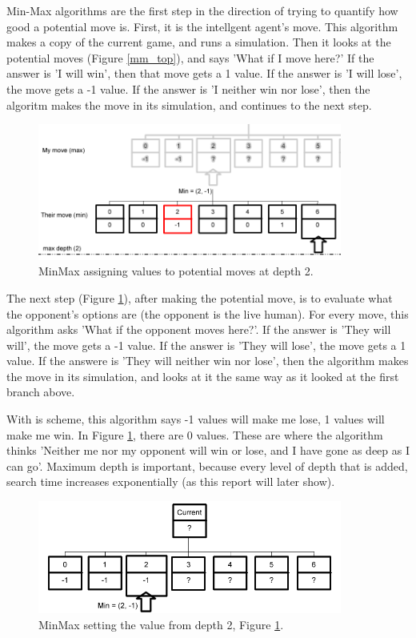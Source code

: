 \documentclass[12pt]{article}
\begin{document}
Min-Max algorithms are the first step in the direction of trying to quantify how good a potential move is.
First, it is the intellgent agent's move. This algorithm makes a copy of the current game, and runs a simulation. Then it looks at the potential moves (Figure \ref{mm_top}), and says 'What if I move here?' If the 
answer is 'I will win', then that move gets a 1 value. If the answer is 'I will lose', the move gets a -1 value. 
If the answer is 'I neither win nor lose', then the algoritm makes the move in its simulation, and continues to
the next step.

\begin{figure}[h]
        \begin{center}
		\includegraphics[width=100mm]{report_images/mm_d2.png}
                	\caption{MinMax assigning values to potential moves at depth 2.}
                	\label{mm_d2}
        \end{center}
\end{figure}

The next step (Figure \ref{mm_d2}), after making the potential move, is to evaluate what the opponent's options are (the opponent is the live human). For every move, this algorithm asks 'What if the opponent moves here?'. If the answer is 'They will will', the move gets a -1 value. If the answer is 'They will lose', the move gets a 1 value. If the answere is 'They will neither win nor lose', then the algorithm makes the move in its simulation, and looks at it the same way as it looked at the first branch above.

With is scheme, this algorithm says -1 values will make me lose, 1 values will make me win. In Figure \ref{mm_d2}, there are 0 values. These are where the algorithm thinks 'Neither me nor my opponent will win or lose, and I have gone as deep as I can go'. Maximum depth is important, because every level of depth that
is added, search time increases exponentially (as this report will later show).

\begin{figure}[h]
        \begin{center}
		\includegraphics[width=100mm]{report_images/mm_reduce.png}
                	\caption{MinMax setting the value from depth 2, Figure \ref{mm_d2}.}
                	\label{mm_reduce}
        \end{center}
\end{figure}
\end{document}

